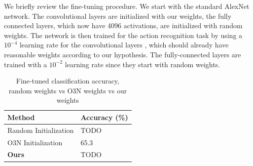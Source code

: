 We briefly review the fine-tuning procedure. We start with the standard AlexNet network. The convolutional layers are initialized with our weights, the fully connected layers, which now have 4096 activations, are initialized with random weights. The network is then trained for the action recognition task by using a $10^{-4}$ learning rate for the convolutional layers , which should already have reasonable weights according to our hypothesis. The fully-connected layers are trained with a $10^{-2}$ learning rate since they start with random weights. 

\begin{table}
    \centering
    \begin{tabu} to 0.5\textwidth {|X[l]|X[c]|}
        \hline
        Method & Accuracy (\%) \\ \hline \hline
        Random Initialization & TODO \\ \hline
        O3N Initialization & 65.3 \\ \hline
        \textbf{Ours} & TODO \\ \hline
    \end{tabu}
    \caption{Fine-tuned classification accuracy, random weights vs O3N weights vs our weights}
    \label{fig:classres}
\end{table}



